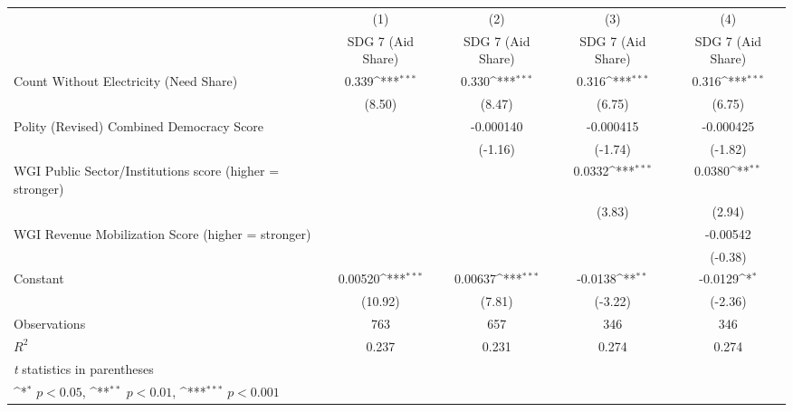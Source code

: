 {
\def\sym#1{\ifmmode^{#1}\else\(^{#1}\)\fi}
\begin{tabular}{l*{4}{c}}
\hline\hline
                &\multicolumn{1}{c}{(1)}&\multicolumn{1}{c}{(2)}&\multicolumn{1}{c}{(3)}&\multicolumn{1}{c}{(4)}\\
                &\multicolumn{1}{c}{SDG 7 (Aid Share)}&\multicolumn{1}{c}{SDG 7 (Aid Share)}&\multicolumn{1}{c}{SDG 7 (Aid Share)}&\multicolumn{1}{c}{SDG 7 (Aid Share)}\\
\hline
Count Without Electricity (Need Share)&    0.339\sym{***}&    0.330\sym{***}&    0.316\sym{***}&    0.316\sym{***}\\
                &   (8.50)         &   (8.47)         &   (6.75)         &   (6.75)         \\
[1em]
Polity (Revised) Combined Democracy Score&                  &-0.000140         &-0.000415         &-0.000425         \\
                &                  &  (-1.16)         &  (-1.74)         &  (-1.82)         \\
[1em]
WGI Public Sector/Institutions score (higher = stronger)&                  &                  &   0.0332\sym{***}&   0.0380\sym{**} \\
                &                  &                  &   (3.83)         &   (2.94)         \\
[1em]
WGI Revenue Mobilization Score (higher = stronger)&                  &                  &                  & -0.00542         \\
                &                  &                  &                  &  (-0.38)         \\
[1em]
Constant        &  0.00520\sym{***}&  0.00637\sym{***}&  -0.0138\sym{**} &  -0.0129\sym{*}  \\
                &  (10.92)         &   (7.81)         &  (-3.22)         &  (-2.36)         \\
\hline
Observations    &      763         &      657         &      346         &      346         \\
\(R^{2}\)       &    0.237         &    0.231         &    0.274         &    0.274         \\
\hline\hline
\multicolumn{5}{l}{\footnotesize \textit{t} statistics in parentheses}\\
\multicolumn{5}{l}{\footnotesize \sym{*} \(p<0.05\), \sym{**} \(p<0.01\), \sym{***} \(p<0.001\)}\\
\end{tabular}
}
